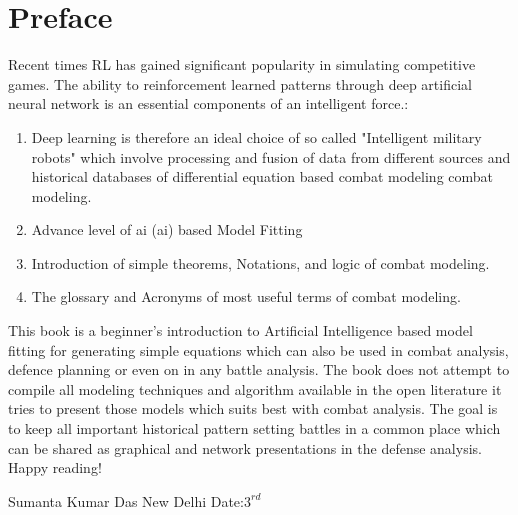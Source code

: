 \documentclass[]{article}
\begin{document}
\section*{Preface}
\justifying
Recent times RL has gained significant popularity in simulating competitive games. The ability to reinforcement learned patterns through  deep artificial neural network is an essential components of an  intelligent force.:
\begin{enumerate}
    \item Deep learning is therefore an ideal choice of so called "Intelligent military robots" which involve processing and fusion of data from different sources and historical databases of differential equation based combat modeling \Gls{combat modeling}.
    \item Advance level of \acrlong{ai} (\acrshort{ai}) based Model Fitting
    \item Introduction of simple theorems, Notations, and logic of combat modeling.
    \item The glossary and Acronyms of most useful terms of combat modeling.
\end{enumerate}
This book is a beginner’s introduction to \Gls{Artificial Intelligence} based model fitting for generating simple equations which can also be used in combat analysis, defence planning or even on in any battle analysis. The book does not attempt to compile all modeling techniques and algorithm available in the open literature it tries to present those models which suits best with combat analysis. The goal is to keep all important historical pattern setting battles in a common place which can be shared as graphical and network presentations in the defense analysis.
\newline
Happy reading!\newline


\RaggedLeft    
Sumanta Kumar Das\newline
New Delhi\newline
Date:$3^{rd}$ 
\newpage
\end{document}
